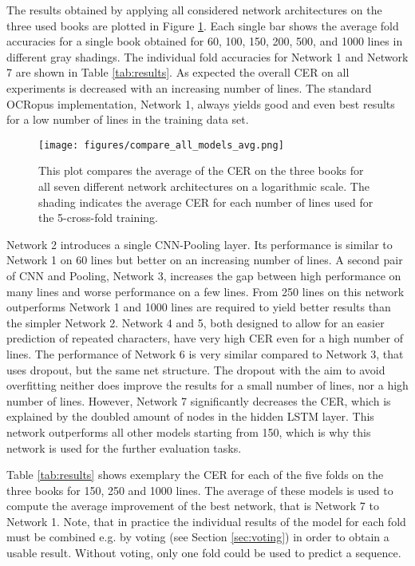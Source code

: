 \documentclass{jlcl}
\begin{document}
The results obtained by applying all considered network architectures on the three used books are plotted in Figure \ref{fig:compare_all_models_avg}.
Each single bar shows the average fold accuracies for a single book obtained for 60, 100, 150, 200, 500, and 1000 lines in different gray shadings.
The individual fold accuracies for Network 1 and Network 7 are shown in Table \ref{tab:results}.
As expected the overall CER on all experiments is decreased with an increasing number of lines.
The standard OCRopus implementation, Network 1, always yields good and even best results for a low number of lines in the training data set.
\begin{figure}
    \centering
    \texttt{[image: figures/compare\_all\_models\_avg.png]}
    \caption{This plot compares the average of the CER on the three books for all seven different network architectures on a logarithmic scale. The shading indicates the average CER for each number of lines used for the 5-cross-fold training.}
    \label{fig:compare_all_models_avg}
\end{figure}
Network 2 introduces a single CNN-Pooling layer. Its performance is similar to Network 1 on 60 lines but better on an increasing number of lines.
A second pair of CNN and Pooling, Network 3, increases the gap between high performance on many lines and worse performance on a few lines.
From 250 lines on this network outperforms Network 1 and 1000 lines are required to yield better results than the simpler Network 2.
Network 4 and 5, both designed to allow for an easier prediction of repeated characters, have very high CER even for a high number of lines.
The performance of Network 6 is very similar compared to Network 3, that uses dropout, but the same net structure.
The dropout with the aim to avoid overfitting neither does improve the results for a small number of lines, nor a high number of lines.
However, Network 7 significantly decreases the CER, which is explained by the doubled amount of nodes in the hidden LSTM layer.
This network outperforms all other models starting from 150, which is why this network is used for the further evaluation tasks.


Table \ref{tab:results} shows exemplary the CER for each of the five folds on the three books for 150, 250 and 1000 lines.
The average of these models is used to compute the average improvement of the best network, that is Network 7 to Network 1.
Note, that in practice the individual results of the model for each fold must be combined e.g. by voting (see Section \ref{sec:voting}) in order to obtain a usable result.
Without voting, only one fold could be used to predict a sequence.
\end{document}
